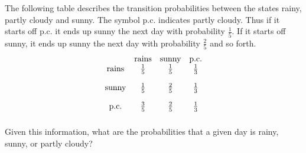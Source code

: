 \begin{enumialphparenastyle}
\begin{ex} The following table describes the transition probabilities between the
states rainy, partly cloudy and sunny. The symbol p.c. indicates partly
cloudy. Thus if it starts off p.c. it ends up sunny the next day with
probability $\frac{1}{5}.$ If it starts off sunny, it ends up sunny the next
day with probability $\frac{2}{5}$ and so forth.
\begin{equation*}
\begin{array}{cccc}
& \text{rains} & \text{sunny} & \text{p.c.} \\
\text{rains} & \vspace{0.05in}\frac{1}{5} & \vspace{0.05in}\frac{1}{5} & \vspace{0.05in}\frac{1}{3} \\
\text{sunny} & \vspace{0.05in}\frac{1}{5} & \vspace{0.05in}\frac{2}{5} & \vspace{0.05in}\frac{1}{3} \\
\text{p.c.} & \vspace{0.05in}\frac{3}{5} & \vspace{0.05in}\frac{2}{5} & \vspace{0.05in}\frac{1}{3}
\end{array}
\end{equation*}
Given this information, what are the probabilities that a given day is
rainy, sunny, or partly cloudy? \vspace{1mm}
\end{ex}


\end{enumialphparenastyle}
